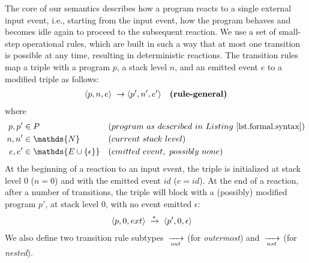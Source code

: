The core of our semantics describes how a program reacts to a single external 
input event, i.e., starting from the input event, how the program behaves and 
becomes idle again to proceed to the subsequent reaction.
%
We use a set of small-step operational rules, which are built in such a way 
that at most one transition is possible at any time, resulting in deterministic 
reactions.
%
The transition rules map a triple with a program $p$, a stack level $n$, and an
emitted event $e$ to a modified triple as follows:
%
\begin{align*}
\langle p,  n,  e  \rangle &\;\xrightarrow{\;}
\langle p', n', e' \rangle
    & \textbf{(rule-general)}
\end{align*}
%
where
%
\begin{align*}
p, p' &\in P
    && (program~as~described~in~Listing~\ref{lst.formal.syntax})
\\
n, n' &\in \mathds{N}
    && (current~stack~level)
\\
e, e' &\in \mathds{E \cup \{\epsilon\}}
    && (emitted~event,~possibly~none)
\end{align*}
%
At the beginning of a reaction to an input event, the triple is initialized at
stack level $0$ ($n=0$) and with the emitted event $id$ ($e=id$).
At the end of a reaction, after a number of transitions, the triple will block
with a (possibly) modified program $p'$, at stack level $0$, with no event
emitted $\epsilon$:
%
\begin{align*}
\langle p,0,ext \rangle
    & \;\xrightarrow{*}\;
\langle p',0,\epsilon \rangle
\end{align*}
%
We also define two transition rule subtypes $\;\xrightarrow[out]{\;}$ (for \emph{outermost}) and
$\;\xrightarrow[nst]{\;}$ (for \emph{nested}).

